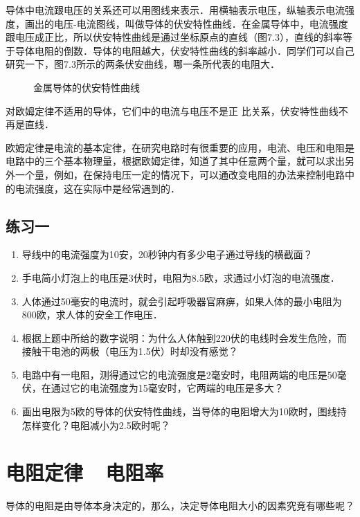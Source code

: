 导体中电流跟电压的关系还可以用图线来表示．用横轴表示电压，纵轴表示电流强度，画出的电压-电流图线，叫做导体的伏安特性曲线．在金属导体中，电流强度跟电压成正比，所以伏安特性曲线是通过坐标原点的直线（图7.3），直线的斜率等于导体电阻的倒数．导体的电阻越大，伏安特性曲线的斜率越小．同学们可以自己研究一下，图7.3所示的两条伏安曲线，哪一条所代表的电阻大．
\begin{figure}[htp]
    \centering
{}
    \caption{金属导体的伏安特性曲线}
\end{figure}


对欧姆定律不适用的导体，它们中的电流与电压不是正
比关系，伏安特性曲线不再是直线．

欧姆定律是电流的基本定律，在研究电路时有很重要的应用，电流、电压和电阻是电路中的三个基本物理量，根据欧姆定律，知道了其中任意两个量，就可以求出另外一个量，例如，在保持电压一定的情况下，可以通改变电阻的办法来控制电路中的电流强度，这在实际中是经常遇到的．


\subsection*{练习一}

\begin{enumerate}
    \item 导线中的电流强度为10安，20秒钟内有多少电子通过导线的横截面？
    \item 手电简小灯泡上的电压是3伏时，电阻为8.5欧，求通过小灯泡的电流强度．
    \item 人体通过50毫安的电流时，就会引起呼吸器官麻痹，如果人体的最小电阻为800欧，求人体的安全工作电压．
    \item 根据上题中所给的数字说明：为什么人体触到220伏的电线时会发生危险，而接触干电池的两极（电压为1.5伏）时却没有感觉？
    \item 电路中有一电阻，测得通过它的电流强度是2毫安时，电阻两端的电压是50毫伏，在通过它的电流强度为15毫安时，它两端的电压是多大？
    \item 画出电限为5欧的导体的伏安特性曲线，当导体的电阻增大为10欧时，图线持怎样变化？电阻减小为2.5欧时呢？
\end{enumerate}


\section{电阻定律~~电阻率}
导体的电阻是由导体本身决定的，那么，决定导体电阻大小的因素究竞有哪些呢？

